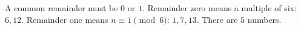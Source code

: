 A common remainder must be $0$ or $1$. Remainder zero means a multiple of six: $6,12$. Remainder one means $n\equiv 1\pmod 6$: $1,7,13$. There are $\boxed 5$ numbers.

